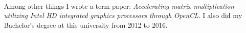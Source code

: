 \divider


 \\

\medskip
Among other things I wrote a term paper: \emph{Accelerating matrix multiplication utilizing Intel HD integrated graphics processors through OpenCL}. I also did my Bachelor's degree at this university from 2012 to 2016.




